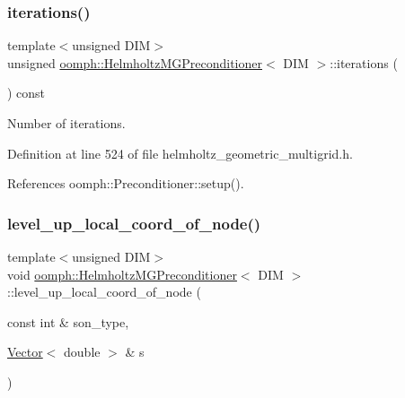 \mbox{\label{classoomph_1_1HelmholtzMGPreconditioner_a5493abcc56c45c927d918d097f747957}} 
\subsubsection{\texorpdfstring{iterations()}{iterations()}}
{\footnotesize\ttfamily template$<$unsigned D\+IM$>$ \\
unsigned \hyperlink{classoomph_1_1HelmholtzMGPreconditioner}{oomph\+::\+Helmholtz\+M\+G\+Preconditioner}$<$ D\+IM $>$\+::iterations (\begin{DoxyParamCaption}{ }\end{DoxyParamCaption}) const\hspace{0.3cm}{\ttfamily [inline]}}



Number of iterations. 



Definition at line 524 of file helmholtz\+\_\+geometric\+\_\+multigrid.\+h.



References oomph\+::\+Preconditioner\+::setup().

\mbox{\label{classoomph_1_1HelmholtzMGPreconditioner_a6a82f0212ff1277a1e8c33a6a81bfeff}} 
\subsubsection{\texorpdfstring{level\+\_\+up\+\_\+local\+\_\+coord\+\_\+of\+\_\+node()}{level\_up\_local\_coord\_of\_node()}\hspace{0.1cm}{\footnotesize\ttfamily [1/3]}}
{\footnotesize\ttfamily template$<$unsigned D\+IM$>$ \\
void \hyperlink{classoomph_1_1HelmholtzMGPreconditioner}{oomph\+::\+Helmholtz\+M\+G\+Preconditioner}$<$ D\+IM $>$\+::level\+\_\+up\+\_\+local\+\_\+coord\+\_\+of\+\_\+node (\begin{DoxyParamCaption}\item[{const int \&}]{son\+\_\+type,  }\item[{\hyperlink{classoomph_1_1Vector}{Vector}$<$ double $>$ \&}]{s }\end{DoxyParamCaption})}



